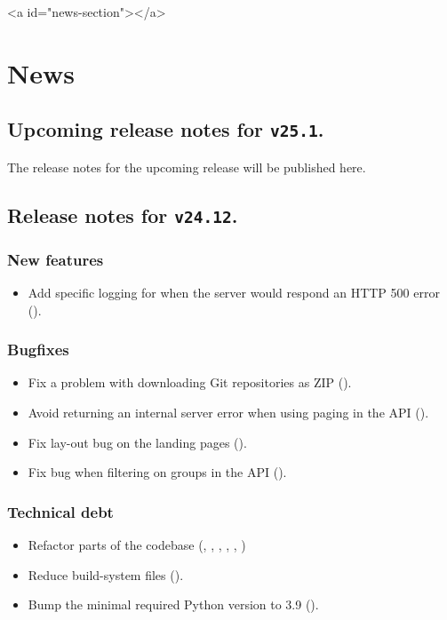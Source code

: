 \ifdefined\HCode
\begin{html}
<a id="news-section"></a>
\end{html}
\fi
\chapter*{News}

\section*{Upcoming release notes for \texttt{v25.1}.}

  The release notes for the upcoming release will be published here.

\section*{Release notes for \texttt{v24.12}.}

\subsection*{New features}
\begin{itemize}
  \item{Add specific logging for when the server would respond an HTTP 500 error ().}
\end{itemize}
\subsection*{Bugfixes}
\begin{itemize}
  \item{Fix a problem with downloading Git repositories as ZIP ().}
  \item{Avoid returning an internal server error when using paging in the API ().}
  \item{Fix lay-out bug on the landing pages ().}
  \item{Fix bug when filtering on groups in the API ().}
\end{itemize}
\subsection*{Technical debt}
\begin{itemize}
  \item{Refactor parts of the codebase (,
      , ,
      , ,
      )}
  \item{Reduce build-system files ().}
  \item{Bump the minimal required Python version to 3.9 ().}
\end{itemize}
